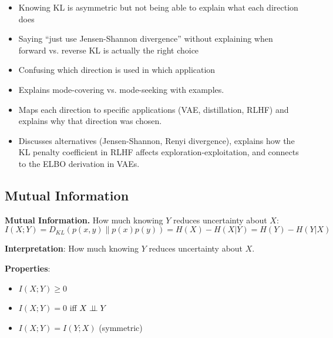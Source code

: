 \begin{interviewq}
\redflags
\begin{itemize}
    \item Knowing KL is asymmetric but not being able to explain what each direction does
    \item Saying ``just use Jensen-Shannon divergence'' without explaining when forward vs. reverse KL is actually the right choice
    \item Confusing which direction is used in which application
\end{itemize}


\goodgreat
\begin{itemize}
    \item {} Explains mode-covering vs. mode-seeking with examples.
    \item {} Maps each direction to specific applications (VAE, distillation, RLHF) and explains why that direction was chosen.
    \item {} Discusses alternatives (Jensen-Shannon, Renyi divergence), explains how the KL penalty coefficient in RLHF affects exploration-exploitation, and connects to the ELBO derivation in VAEs.
\end{itemize}

\end{interviewq}

\subsection{Mutual Information}

\textbf{Mutual Information.} How much knowing $Y$ reduces uncertainty about $X$:
\begin{equation}
I(X; Y) = D_{KL}(p(x,y) \| p(x)p(y)) = H(X) - H(X|Y) = H(Y) - H(Y|X)
\end{equation}

\textbf{Interpretation}: How much knowing $Y$ reduces uncertainty about $X$.

\textbf{Properties}:
\begin{itemize}
    \item $I(X; Y) \geq 0$
    \item $I(X; Y) = 0$ iff $X \perp \!\!\! \perp Y$
    \item $I(X; Y) = I(Y; X)$ (symmetric)
\end{itemize}

